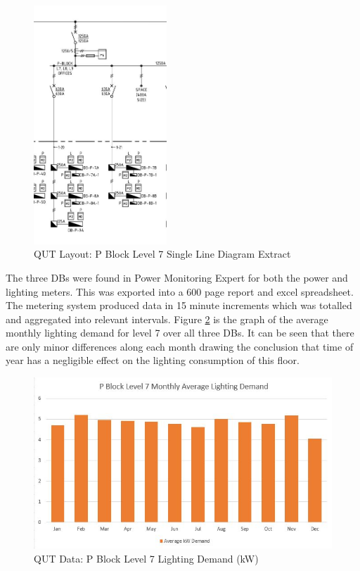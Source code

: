 \begin{figure}[H]
	\hfill\includegraphics[width = 50mm]{images/project-model/qut-lvl7-sld-extract}\hspace*{\fill}
	\caption{QUT Layout: P Block Level 7 Single Line Diagram Extract} 
	\label{fig:project-model-pblock-lvl7-sld-extract}
\end{figure}

The three DBs were found in Power Monitoring Expert for both the power and lighting meters. This was exported into a 600 page report and excel spreadsheet. The metering system produced data in 15 minute increments which was totalled and aggregated into relevant intervals. Figure \ref{fig:pblock-lvl7-monthly-kw} is the graph of the average monthly lighting demand for level 7 over all three DBs. It can be seen that there are only minor differences along each month drawing the conclusion that time of year has a negligible effect on the lighting consumption of this floor.  

\begin{figure}[H]
	\hfill\includegraphics[width = 150mm]{images/metering/pme/pblock-lvl7-monthly-kw}\hspace*{\fill}
	\caption{QUT Data: P Block Level 7 Lighting Demand (kW)} 
	\label{fig:pblock-lvl7-monthly-kw}
\end{figure}  


